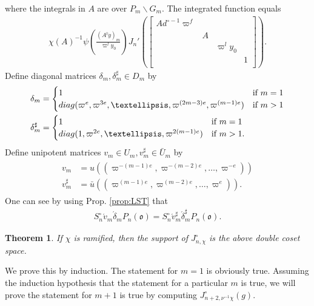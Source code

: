 \documentclass[11pt]{amsart}
\newcommand\Vp{\varpi}%
\newcommand\vp{\varphi}%
\newcommand\oo{\mathfrak{o}}
\newcommand\1{\mathbf{1}}
\newcommand\diag{{\rm diag}}
\newcommand\nid{\noindent}
\newcommand\ac{\acute}
\newcommand\bs{\backslash}%
\newcommand\bu{\bar{u}}
\numberwithin{equation}{section}
\newtheorem{thm}{Theorem}[section]
\begin{document}
where the integrals in $A$ are over $P_m \bs G_{m}$. 
The integrated function equals 
\begin{align}
\chi(A)^{-1} \psi\left(\frac{(A {}^t \dot{y})_m}{\Vp^l y_{0}}\right) J_n'(\begin{bmatrix}
A d_{}^{\circ -1}\Vp^f & & &  \\
&A & & \\
& & \Vp^l y_{0} &  \\
& & &1  \\
\end{bmatrix}). \label{eq:intIxfn}
\end{align}  
Define diagonal matrices $\delta_m, \delta_m^\sharp \in D_m$ by
\begin{align}
\begin{split}
\delta_m &= 
\begin{cases}
1  & \mbox{if $m=1$} \\
\diag(\Vp^e, \Vp^{3e}, \ldots, \Vp^{(2m-3)e}, \Vp^{(m-1)e}) & \mbox{if $m > 1$} 
\end{cases}\\
\delta_m^\sharp &= 
\begin{cases}
1 & \mbox{if $m = 1$} \\
\diag(1, \Vp^{2e}, \ldots, \Vp^{2(m-1)e} ) & \mbox{if $m > 1$.} 
\end{cases}
\end{split}
\label{def:dm}
\end{align}
Define unipotent matrices $v_m  \in U_m, v_m^\sharp  \in \bar{U}_m$ by 
\begin{align}
\begin{split}
v_m &= u((\Vp^{-(m-1)e}, \Vp^{-(m-2)e }, \ldots, \Vp^{-e})) \\
v_m^\sharp&= \bu((\Vp^{(m-1)e},\Vp^{(m-2)e }, \ldots, \Vp^e)).
\end{split}
\label{def:um}
\end{align} 
One can see by using Prop. \ref{prop:LST} that
\begin{align*}
S_{n}^\circ \ac{v}_{m} \ac{\delta}_{m} P_{n}(\oo) = S_{n}^\circ \ac{v}^\sharp_{m} \ac{\delta}_{m}^\sharp P_{n}(\oo).
\end{align*} 
\begin{thm}\label{thm:suppJ}
If $\chi$ is ramified, then the support of $J_{n,\chi}^\circ$ is the above double coset space.
\end{thm}
\nid
We prove this by induction.
The statement for $m =  1$ is obviously true.
Assuming the induction hypothesis that the statement for a particular $m$ is true, we will prove the statement for $m+1$ is true by computing $J_{n+2, \nu^{-1}\chi}^\circ(g)$.
\end{document}
